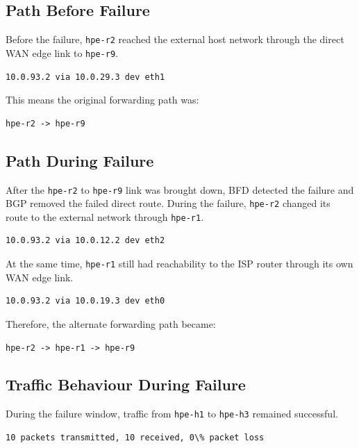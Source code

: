 \subsection{Path Before Failure}

Before the failure, \texttt{hpe-r2} reached the external host network through the direct WAN edge link to \texttt{hpe-r9}.

\begin{verbatim}
10.0.93.2 via 10.0.29.3 dev eth1
\end{verbatim}

This means the original forwarding path was:

\begin{verbatim}
hpe-r2 -> hpe-r9
\end{verbatim}

\subsection{Path During Failure}

After the \texttt{hpe-r2} to \texttt{hpe-r9} link was brought down, BFD detected the failure and BGP removed the failed direct route. During the failure, \texttt{hpe-r2} changed its route to the external network through \texttt{hpe-r1}.

\begin{verbatim}
10.0.93.2 via 10.0.12.2 dev eth2
\end{verbatim}

At the same time, \texttt{hpe-r1} still had reachability to the ISP router through its own WAN edge link.

\begin{verbatim}
10.0.93.2 via 10.0.19.3 dev eth0
\end{verbatim}

Therefore, the alternate forwarding path became:

\begin{verbatim}
hpe-r2 -> hpe-r1 -> hpe-r9
\end{verbatim}

\subsection{Traffic Behaviour During Failure}

During the failure window, traffic from \texttt{hpe-h1} to \texttt{hpe-h3} remained successful.

\begin{verbatim}
10 packets transmitted, 10 received, 0\% packet loss
\end{verbatim}

